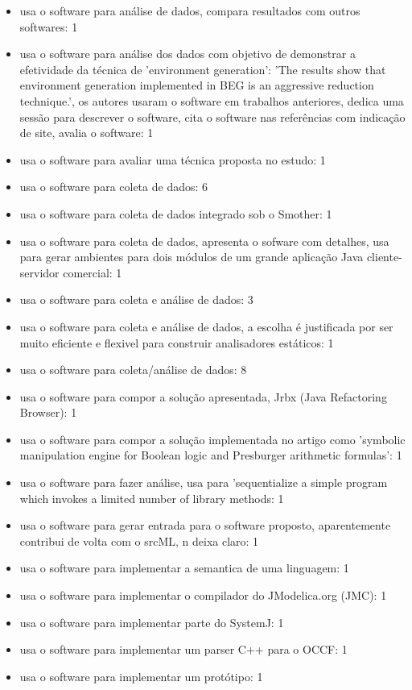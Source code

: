 \begin{itemize}
\item usa o software para análise de dados, compara resultados com outros softwares: 1
\item usa o software para análise dos dados com objetivo de demonstrar a efetividade da técnica de 'environment generation': 'The results show that environment generation implemented in BEG is an aggressive reduction technique.', os autores usaram o software em trabalhos anteriores, dedica uma sessão para descrever o software, cita o software nas referências com indicação de site, avalia o software: 1
\item usa o software para avaliar uma técnica proposta no estudo: 1
\item usa o software para coleta de dados: 6
\item usa o software para coleta de dados integrado sob o Smother: 1
\item usa o software para coleta de dados, apresenta o sofware com detalhes, usa para gerar ambientes para dois módulos de um grande aplicação Java cliente-servidor comercial: 1
\item usa o software para coleta e análise de dados: 3
\item usa o software para coleta e análise de dados, a escolha é justificada por ser muito eficiente e flexivel para construir analisadores estáticos: 1
\item usa o software para coleta/análise de dados: 8
\item usa o software para compor a solução apresentada, Jrbx (Java Refactoring Browser): 1
\item usa o software para compor a solução implementada no artigo como 'symbolic manipulation engine for Boolean logic and Presburger arithmetic formulas': 1
\item usa o software para fazer análise, usa para 'sequentialize a simple program which invokes a limited number of library methods: 1
\item usa o software para gerar entrada para o software proposto, aparentemente contribui de volta com o srcML, n deixa claro: 1
\item usa o software para implementar a semantica de uma linguagem: 1
\item usa o software para implementar o compilador do JModelica.org (JMC): 1
\item usa o software para implementar parte do SystemJ: 1
\item usa o software para implementar um parser C++ para o OCCF: 1
\item usa o software para implementar um protótipo: 1

\end{itemize}
